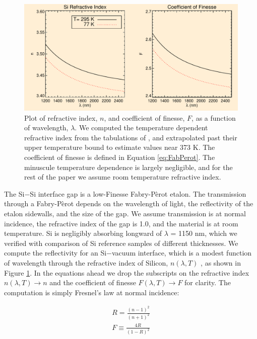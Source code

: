 \documentclass[osajnl,preprint,showpacs,superscriptaddress,12pt]{revtex4-1} %
\begin{document}
\begin{figure}[htbp]
\centerline{\includegraphics[width=0.95\columnwidth]{figs/SiIndexAOmgsFinesseFig.pdf}}
\caption{Plot of refractive index, $n$, and coefficient of finesse, $F$, as a function of wavelength, $\lambda$.\label{figSiIndexFinesse} We computed the temperature dependent refractive index from the tabulations of \cite{2006SPIE.6273E..77F}, and extrapolated past their upper temperature bound to estimate values near 373 K.  The coefficient of finesse is defined in Equation \ref{eq:FabPerot}.  The minuscule temperature dependence is largely negligible, and for the rest of the paper we assume room temperature refractive index.}
\end{figure}

The Si$-$Si interface gap is a low-Finesse Fabry-P\`{e}rot etalon\cite{2007fuph.book.....S}.  The transmission through a Fabry-P\`{e}rot depends on the wavelength of light, the reflectivity of the etalon sidewalls, and the size of the gap.  We assume transmission is at normal incidence, the refractive index of the gap is 1.0, and the material is at room temperature.  Si is negligibly absorbing longward of $\lambda$ = 1150 nm, which we verified with comparison of Si reference samples of different thicknesses.  We compute the reflectivity for an Si$-$vacuum interface, which is a modest function of wavelength through the refractive index of Silicon, $n(\lambda, T)$ \cite{2006SPIE.6273E..77F}, as shown in Figure \ref{figSiIndexFinesse}.  In the equations ahead we drop the subscripts on the refractive index $n(\lambda, T) \rightarrow n$ and the coefficient of finesse $F(\lambda, T) \rightarrow F$ for clarity.  The computation is simply Fresnel's law at normal incidence:

\begin{eqnarray}
R = \frac{(n-1)^2}{(n+1)^2} \\
F \equiv \frac{4R}{(1-R)^2}
\end{eqnarray}
\end{document}
